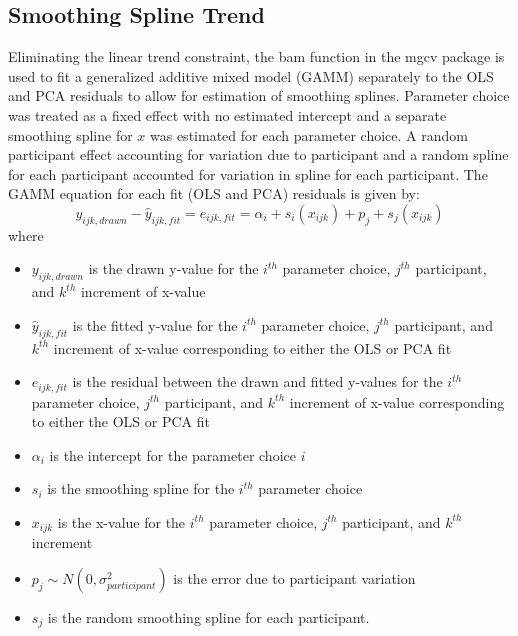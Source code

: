\documentclass[12pt]{article}
\providecommand{\tightlist}{%
  \setlength{\itemsep}{0pt}\setlength{\parskip}{0pt}}
\begin{document}
\hypertarget{smoothing-spline-trend}{%
\subsection{Smoothing Spline Trend}\label{smoothing-spline-trend}}

Eliminating the linear trend constraint, the bam function in the mgcv
package \citep{mgcv1, mgcv2, mgcv3, mgcv4, mgcv5} is used to fit a
generalized additive mixed model (GAMM) separately to the OLS and PCA
residuals to allow for estimation of smoothing splines. Parameter choice
was treated as a fixed effect with no estimated intercept and a separate
smoothing spline for \(x\) was estimated for each parameter choice. A
random participant effect accounting for variation due to participant
and a random spline for each participant accounted for variation in
spline for each participant. The GAMM equation for each fit (OLS and
PCA) residuals is given by: \begin{equation}
y_{ijk, drawn} - \hat y_{ijk, fit} = e_{ijk,fit} = \alpha_i + s_{i}(x_{ijk}) + p_{j} + s_{j}(x_{ijk})
\end{equation} \noindent where

\begin{itemize}
\tightlist
\item
  \(y_{ijk,drawn}\) is the drawn y-value for the \(i^{th}\) parameter
  choice, \(j^{th}\) participant, and \(k^{th}\) increment of x-value
\item
  \(\hat y_{ijk,fit}\) is the fitted y-value for the \(i^{th}\)
  parameter choice, \(j^{th}\) participant, and \(k^{th}\) increment of
  x-value corresponding to either the OLS or PCA fit
\item
  \(e_{ijk,fit}\) is the residual between the drawn and fitted y-values
  for the \(i^{th}\) parameter choice, \(j^{th}\) participant, and
  \(k^{th}\) increment of x-value corresponding to either the OLS or PCA
  fit
\item
  \(\alpha_i\) is the intercept for the parameter choice \(i\)
\item
  \(s_{i}\) is the smoothing spline for the \(i^{th}\) parameter choice
\item
  \(x_{ijk}\) is the x-value for the \(i^{th}\) parameter choice,
  \(j^{th}\) participant, and \(k^{th}\) increment
\item
  \(p_{j} \sim N(0, \sigma^2_{participant})\) is the error due to
  participant variation
\item
  \(s_{j}\) is the random smoothing spline for each participant.
\end{itemize}
\end{document}
